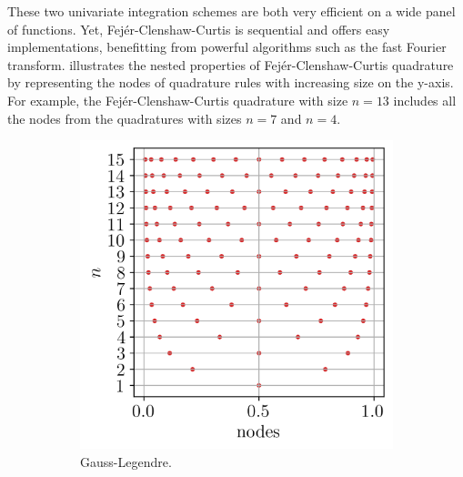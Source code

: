 These two univariate integration schemes are both very efficient on a wide panel of functions. 
Yet, Fej\'{e}r-Clenshaw-Curtis is sequential and offers easy implementations, benefitting from powerful algorithms such as the fast Fourier transform. 
 illustrates the nested properties of Fej\'{e}r-Clenshaw-Curtis quadrature by representing the nodes of quadrature rules with increasing size on the y-axis.  
For example, the Fej\'{e}r-Clenshaw-Curtis quadrature with size $n=13$ includes all the nodes from the quadratures with sizes $n=7$ and $n=4$. 

\begin{figure}[ht]
    \centering
    \begin{subfigure}[b]{0.32\textwidth}
        \centering
        \includegraphics[width=\textwidth]{../numerical_experiments/chapter1/figures/univariate_gauss_legendre.png}
        \caption{Gauss-Legendre.}
    \end{subfigure}
    \quad
    \begin{subfigure}[b]{0.32\textwidth}
        \centering

\end{subfigure}
\end{figure}

